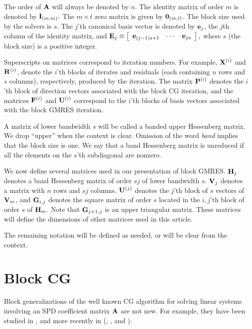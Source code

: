 \documentclass[twoside]{siamltex}
\newcommand{\bA}{{\bf A}}
\newcommand{\bE}{{\bf E}}
\newcommand{\bF}{{\bf F}}
\newcommand{\bG}{{\bf G}}
\newcommand{\bH}{{\bf H}}
\newcommand{\bV}{{\bf V}}
\newcommand{\bP}{{\bf P}}
\newcommand{\bU}{{\bf U}}
\newcommand{\bR}{{\bf R}}
\newcommand{\bX}{{\bf X}}
\newcommand{\be}{{\bf e}}
\begin{document}
The order of $\bA$ will always be denoted by $n.$ The identity
matrix of order $m$ is denoted by ${\bf I}_{(m,m)}.$ The $m \times
t$ zero matrix is given by ${\bf 0}_{(m,t)}$. The block size used
by the solvers is $s$. The $j$'th canonical basis vector is
denoted by ${\bf e}_j$, the $j$th column of the identity matrix,
and
 $\bE_j \equiv \left[\begin{array}{ccc}
                    \be_{(j-1)s+1} & \cdots & \be_{js}
                   \end{array}\right] ,$
where $s$ (the block size) is a positive integer.

Superscripts on matrices correspond to iteration numbers. For
example, $\bX^{(i)}$ and $\bR^{(i)}$, denote the $i$'th blocks of
iterates and residuals (each containing $n$ rows and $s$ columns),
respectively, produced by the iteration. The matrix $\bP^{(i)}$
denotes the $i$'th block of direction vectors associated with the
block CG iteration, and the matrices $\bF^{(i)}$ and $\bU^{(i)}$
correspond to the $i$'th blocks of basis vectors associated with
the block GMRES iteration.

A matrix of lower bandwidth $s$ will be called a banded upper
Hessenberg matrix.  We drop ``upper'' when the context is clear.
Omission of the word {\em band} implies that the block size is
one. We say that a band Hessenberg matrix is unreduced if all the
elements on the $s$'th subdiagonal are nonzero.

We now define several matrices used in our presentation of block
GMRES. $\bH_j$ denotes a band Hessenberg matrix of order $sj$ of
lower bandwidth $s$. $\bV_j$ denotes a matrix with $n$ rows and
$sj$ columns. $\bU^{(j)}$ denotes the $j$'th block of $s$ vectors
of $\bV_m$, and $\bG_{i,j}$ denotes the square matrix of order $s$
located in the $i,j$'th block of order $s$ of $\bH_m.$ Note that
$\bG_{j+1,j}$ is an upper triangular matrix. These matrices will
define the dimensions of other matrices used in this article.

The remaining notation will be defined as needed, or will be clear
from the context.


\section{Block CG}
\label{sec:blkcg}

Block generalizations of the well known CG algorithm \cite{HS52}
for solving linear systems involving an SPD coefficient matrix
$\bA$ are not new. For example, they have been studied in
\cite{olea:80}, and more recently in (\cite{FOP95}, \cite{NY95},
and \cite{DUB01}).
\end{document}
